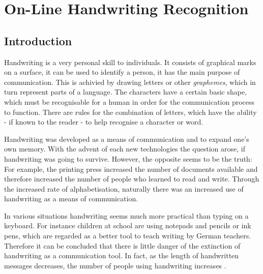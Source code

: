 
\chapter{On-Line Handwriting Recognition}
\label{chap:onlinehwr}


\section{Introduction}
\label{sec:onlinehwrintroduction}


Handwriting is a very personal skill to individuals. It consists of graphical
marks on a surface, it can be used to identify a person, it has the main
purpose of communication. This is achivied by drawing letters or other 
\emph{graphemes}, which in turn represent parts of a language.
The characters have a certain basic shape, which must be recognisable
for a human in order for the communication process to function.
There are rules for the combination of letters, which have the ability - if
known to the reader - to help recognise a character or word.

Handwriting was developed as a means of communication and to expand one's own
memory. With the advent of each new technologies the question arose, 
if handwriting was going to survive. However, the opposite seems to be the 
truth: For example, the printing press increased the number of documents
available and therefore increased the number of people who learned to read
and write. Through the increased rate of alphabetisation, naturally there was
an increased use of handwriting as a means of communication.

In various situations handwriting seems much more practical than typing on a
keyboard. For instance children at school are using notepads and pencils or
ink pens, which are regarded as a better tool to teach writing by German 
teachers. Therefore it can be concluded that there is little danger of
the extinction of handwriting as a communication tool. In fact, as 
the length of handwritten messages decreases, the number of people using 
handwriting increases .


